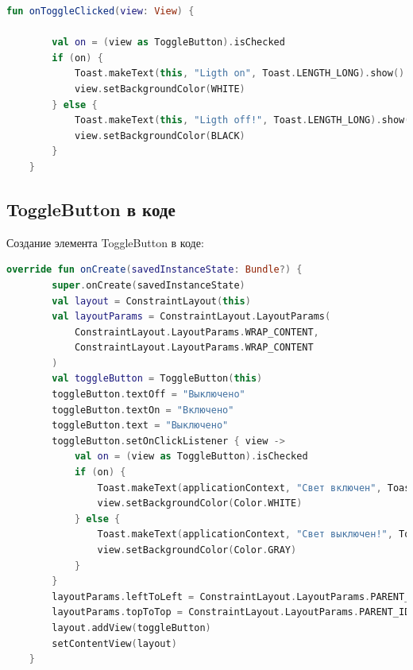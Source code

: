\begin{lstlisting}[language=Kotlin, caption=\leftline{ToggleButton Kotlin}, label=lst:ToggleButtonKotlin]
fun onToggleClicked(view: View) {

        val on = (view as ToggleButton).isChecked
        if (on) {
            Toast.makeText(this, "Ligth on", Toast.LENGTH_LONG).show()
            view.setBackgroundColor(WHITE)
        } else {
            Toast.makeText(this, "Ligth off!", Toast.LENGTH_LONG).show()
            view.setBackgroundColor(BLACK)
        }
    }
\end{lstlisting}




\subsection{ToggleButton в коде}
Создание элемента ToggleButton в коде:
\begin{lstlisting}[language=Kotlin, caption=\leftline{ToggleButton Kotlin}, label=lst:ToggleButtoninKotlin]
override fun onCreate(savedInstanceState: Bundle?) {
        super.onCreate(savedInstanceState)
        val layout = ConstraintLayout(this)
        val layoutParams = ConstraintLayout.LayoutParams(
            ConstraintLayout.LayoutParams.WRAP_CONTENT,
            ConstraintLayout.LayoutParams.WRAP_CONTENT
        )
        val toggleButton = ToggleButton(this)
        toggleButton.textOff = "Выключено"
        toggleButton.textOn = "Включено"
        toggleButton.text = "Выключено"
        toggleButton.setOnClickListener { view ->
            val on = (view as ToggleButton).isChecked
            if (on) {
                Toast.makeText(applicationContext, "Свет включен", Toast.LENGTH_LONG).show()
                view.setBackgroundColor(Color.WHITE)
            } else {
                Toast.makeText(applicationContext, "Свет выключен!", Toast.LENGTH_LONG).show()
                view.setBackgroundColor(Color.GRAY)
            }
        }
        layoutParams.leftToLeft = ConstraintLayout.LayoutParams.PARENT_ID
        layoutParams.topToTop = ConstraintLayout.LayoutParams.PARENT_ID
        layout.addView(toggleButton)
        setContentView(layout)
    }
\end{lstlisting}
